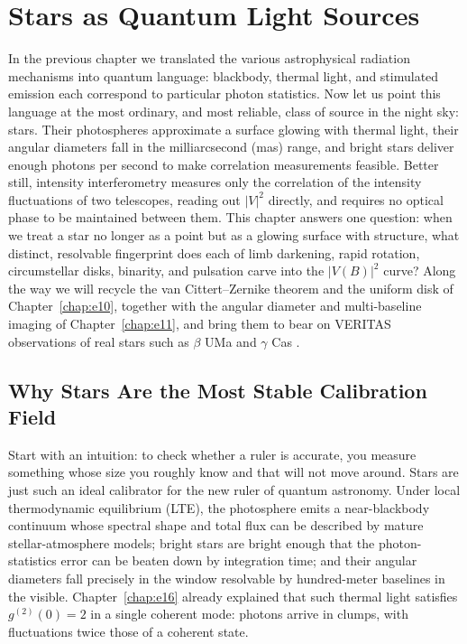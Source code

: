 \chapter{Stars as Quantum Light Sources}
\label{chap:e17}

\begin{chapteropening}
In the previous chapter we translated the various astrophysical radiation mechanisms into quantum language: blackbody, thermal light, and stimulated emission each correspond to particular photon statistics. Now let us point this language at the most ordinary, and most reliable, class of source in the night sky: stars. Their photospheres approximate a surface glowing with thermal light, their angular diameters fall in the milliarcsecond (mas) range, and bright stars deliver enough photons per second to make correlation measurements feasible. Better still, intensity interferometry measures only the correlation of the intensity fluctuations of two telescopes, reading out \(|V|^2\) directly, and requires no optical phase to be maintained between them. This chapter answers one question: when we treat a star no longer as a point but as a glowing surface with structure, what distinct, resolvable fingerprint does each of limb darkening, rapid rotation, circumstellar disks, binarity, and pulsation carve into the \(|V(B)|^2\) curve? Along the way we will recycle the van Cittert--Zernike theorem and the uniform disk of Chapter~\ref{chap:e10}, together with the angular diameter and multi-baseline imaging of Chapter~\ref{chap:e11}, and bring them to bear on VERITAS observations of real stars such as \(\beta\) UMa and \(\gamma\) Cas \citep{1956Natur.177...27B,1974MNRAS.167..121H,1974iiia.book.....H,2020NatAs...4.1164A,2024MNRAS.529.4387A}.
\end{chapteropening}

\section{Why Stars Are the Most Stable Calibration Field}
\label{sec:e17-why-stars}

Start with an intuition: to check whether a ruler is accurate, you measure something whose size you roughly know and that will not move around. Stars are just such an ideal calibrator for the new ruler of quantum astronomy. Under local thermodynamic equilibrium (LTE), the photosphere emits a near-blackbody continuum whose spectral shape and total flux can be described by mature stellar-atmosphere models; bright stars are bright enough that the photon-statistics error can be beaten down by integration time; and their angular diameters fall precisely in the window resolvable by hundred-meter baselines in the visible. Chapter~\ref{chap:e16} already explained that such thermal light satisfies \(g^{(2)}(0)=2\) in a single coherent mode: photons arrive in clumps, with fluctuations twice those of a coherent state.

